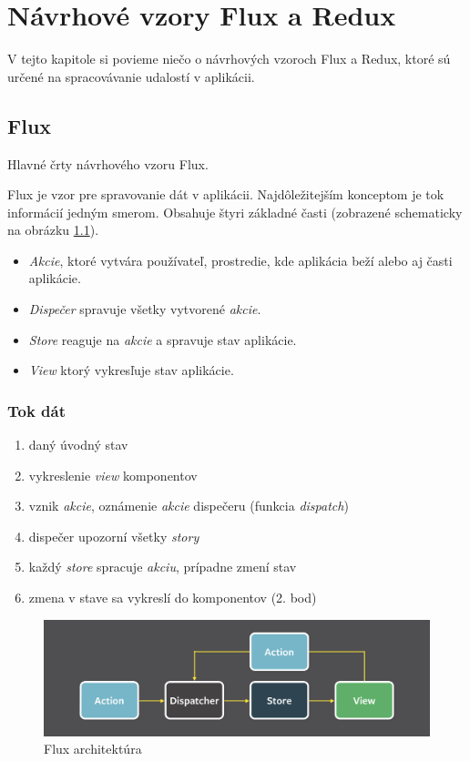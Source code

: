 \chapter{Návrhové vzory Flux a Redux}

\label{kap:vzory} %

V tejto kapitole si povieme niečo o návrhových vzoroch Flux a Redux, ktoré sú určené na spracovávanie udalostí v aplikácii.

\section{Flux}
Hlavné črty návrhového vzoru Flux. \cite[Overview]{Flux} \TODO{}

Flux je vzor pre spravovanie dát v aplikácii. Najdôležitejším konceptom je tok informácií jedným smerom. Obsahuje štyri základné časti (zobrazené schematicky na obrázku \ref{obr:flux}). 
\begin{itemize}
\item \emph{Akcie}, ktoré vytvára používateľ, prostredie, kde aplikácia beží alebo aj časti aplikácie. 
\item \emph{Dispečer} spravuje všetky vytvorené \emph{akcie}. 
\item \emph{Store} reaguje na \emph{akcie} a spravuje stav aplikácie.
\item \emph{View} ktorý vykresľuje stav aplikácie.
\end{itemize}

\subsection{Tok dát}
\begin{enumerate}
\item daný úvodný stav
\item vykreslenie \emph{view} komponentov
\item vznik \emph{akcie}, oznámenie \emph{akcie} dispečeru (funkcia \emph{dispatch})
\item dispečer upozorní všetky \emph{story}
\item každý \emph{store} spracuje \emph{akciu}, prípadne zmení stav
\item zmena v stave sa vykreslí do komponentov (2. bod)
\end{enumerate}

\begin{figure}
  \centering
    \includegraphics[width=\textwidth]{./images/flux.png}
  \caption{Flux architektúra \cite{FluxObr}}\label{obr:flux}
\end{figure}


